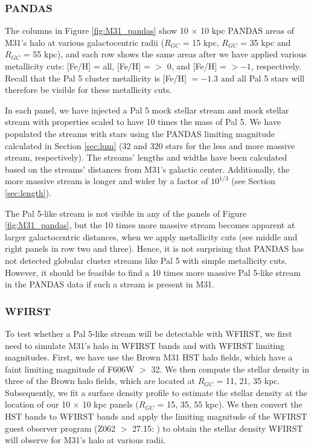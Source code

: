 \documentclass[twocolumn]{aastex62}
\begin{document}
\subsubsection{PANDAS}
\label{sec:PANDAS}
The columns in Figure \ref{fig:M31_pandas} show 10 $\times$ 10 kpc PANDAS areas of M31's halo at various galactocentric radii ($R_{GC}$ = 15  kpc, $R_{GC}$ = 35 kpc and $R_{GC}$ = 55 kpc), and each row shows the same areas after we have applied various metallicity cuts: [Fe/H] = all,  [Fe/H] = $>$ 0, and  [Fe/H] = $> -1 $, respectively. Recall that the Pal 5 cluster metallicity is  [Fe/H] $= -1.3$ and all Pal 5 stars will therefore be visible for these metallicity cuts. 

In each panel, we have injected a Pal 5 mock stellar stream and mock stellar stream with properties scaled to have 10 times the mass of Pal 5. We have populated the streams with stars using the PANDAS limiting magnitude calculated in Section \ref{sec:lum} (32 and 320 stars for the less and more massive stream, respectively).  The streams' lengths and widths have been calculated based on the streams' distances from M31's galactic center. Additionally, the more massive stream is longer and wider by a factor of $10^{1/3}$ (see Section \ref{sec:length}). 

The Pal 5-like stream is not visible in any of the panels of Figure \ref{fig:M31_pandas}, but the 10 times more massive stream becomes apparent at larger galactocentric distances, when we apply metallicity cuts (see middle and right panels in row two and three). Hence, it is not surprising that PANDAS has not detected globular cluster streams like Pal 5 with simple metallicity cuts. However, it should be feasible to find a 10 times more massive Pal 5-like stream in the PANDAS data if such a stream is present in M31. 

\subsubsection{WFIRST}
\label{sec:WFIRST}
To test whether a Pal 5-like stream will be detectable with WFIRST, we first need to simulate M31's halo in WFIRST bands and with WFIRST limiting magnitudes. First, we have use the Brown M31 HST halo fields, which have a faint limiting magnitude of F606W $>$ 32. We then compute the stellar density in three of the Brown halo fields, which are located at $R_{GC}$ = 11, 21, 35 kpc. Subsequently, we fit a surface density profile to estimate the stellar density at the location of our 10 $\times$ 10 kpc panels ($R_{GC}$ = 15, 35, 55 kpc). We then convert the HST bands to WFIRST bands and apply the limiting magnitude of the WFIRST guest observer program (Z062 $>$ 27.15: \citealt{spergel13}) to obtain the stellar density WFIRST will observe for M31's halo at various radii.
\end{document}
